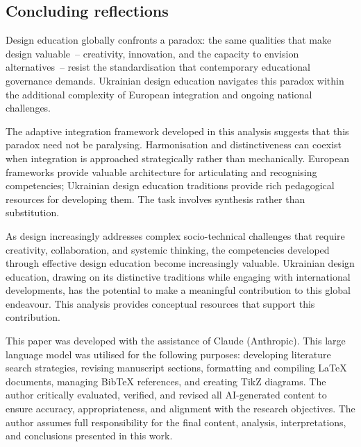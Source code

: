\documentclass[ed]{acnsart}
\begin{document}
	\subsection{Concluding reflections}
	
	Design education globally confronts a paradox: the same qualities that make design valuable~-- creativity, innovation, and the capacity to envision alternatives~-- resist the standardisation that contemporary educational governance demands. Ukrainian design education navigates this paradox within the additional complexity of European integration and ongoing national challenges.
	
	The adaptive integration framework developed in this analysis suggests that this paradox need not be paralysing. Harmonisation and distinctiveness can coexist when integration is approached strategically rather than mechanically. European frameworks provide valuable architecture for articulating and recognising competencies; Ukrainian design education traditions provide rich pedagogical resources for developing them. The task involves synthesis rather than substitution.
	
	As design increasingly addresses complex socio-technical challenges that require creativity, collaboration, and systemic thinking, the competencies developed through effective design education become increasingly valuable. Ukrainian design education, drawing on its distinctive traditions while engaging with international developments, has the potential to make a meaningful contribution to this global endeavour. This analysis provides conceptual resources that support this contribution.
	
	\begin{aideclaration}
		This paper was developed with the assistance of Claude (Anthropic). This large language model was utilised for the following purposes: developing literature search strategies, revising manuscript sections, formatting and compiling LaTeX documents, managing BibTeX references, and creating TikZ diagrams. The author critically evaluated, verified, and revised all AI-generated content to ensure accuracy, appropriateness, and alignment with the research objectives. The author assumes full responsibility for the final content, analysis, interpretations, and conclusions presented in this work. %
	\end{aideclaration}
	
	
	
\end{document}
